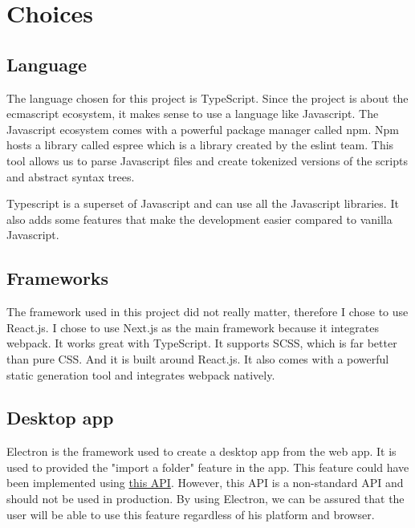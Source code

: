 \section{Choices}

\subsection{Language} 
The language chosen for this project is TypeScript. 
Since the project is about the ecmascript ecosystem, it makes sense to use a language like Javascript. 
The Javascript ecosystem comes with a powerful package manager called npm. 
Npm hosts a library called espree which is a library created by the eslint team. 
This tool allows us to parse Javascript files and create tokenized versions of the scripts and abstract syntax trees. 

\noindent Typescript is a superset of Javascript and can use all the Javascript libraries. It also adds some features that make the development easier compared to vanilla Javascript.

\subsection{Frameworks}
The framework used in this project did not really matter, 
therefore I chose to use React.js. 
I chose to use Next.js as the main framework because it integrates webpack. 
It works great with TypeScript. 
It supports SCSS, which is far better than pure CSS. And it is built around React.js.
It also comes with a powerful static generation tool and integrates webpack natively.

\subsection{Desktop app}
Electron is the framework used to create a desktop app from the web app. 
It is used to provided the "import a folder" feature in the app. 
This feature could have been implemented using 
\href{https://developer.mozilla.org/en-US/docs/Web/API/HTMLInputElement/webkitdirectory}{this API}. 
However, this API is a non-standard API and should not be used in production. 
By using Electron, we can be assured that the user will be able to use this feature regardless of his platform and browser.



